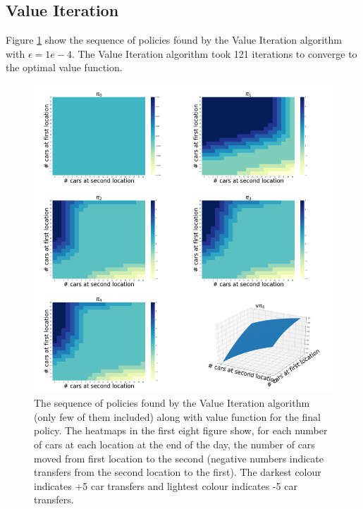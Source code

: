 \documentclass{article}
\begin{document}
\subsection{Value Iteration}
Figure \ref{value_iter_jack_problem} show the sequence of policies found by the Value Iteration algorithm with $\epsilon=1e-4$. The Value Iteration
algorithm took 121 iterations to converge to the optimal value function.
\begin{figure}
    \graphicspath{ {../Experiments/JackRentalProblem/ValueIteration/} }
    \begin{center}
    \includegraphics[width=15cm]{Compact.png}
    \end{center}
    \caption{The sequence of policies found by the Value Iteration algorithm (only few of them included) along with value function
    for the final policy. The heatmaps in the first eight figure show, for each number of cars at each location at the end of the
    day, the number of cars moved from first location to the second (negative numbers indicate transfers from the second location 
    to the first). The darkest colour indicates +5 car transfers and lightest colour indicates -5 car transfers.}
    \label{value_iter_jack_problem}
\end{figure}
\end{document}
